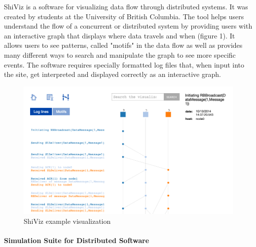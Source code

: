 \documentclass[12pt, oneside]{article}   	%
\begin{document}
ShiViz is a software for visualizing data flow through distributed systems.  It was created by students at the University of British Columbia.  The tool helps users understand the flow of a concurrent or distributed system by providing users with an interactive graph that displays where data travels and when \cite{ShiViz} (figure 1).  It allows users to see patterns, called "motifs" in the data flow as well as provides many different ways to search and manipulate the graph to see more specific events\cite{ShiViz}.  The software requires specially formatted log files that, when input into the site, get interpreted and displayed correctly as an interactive graph.
\begin{figure}[t!]
\caption{ShiViz example visualization\cite{ShiViz}}
\includegraphics[scale=0.4]{ShiViz_Example.png} 
\centering
\end{figure}

\paragraph{Simulation Suite for Distributed Software}
\end{document}
